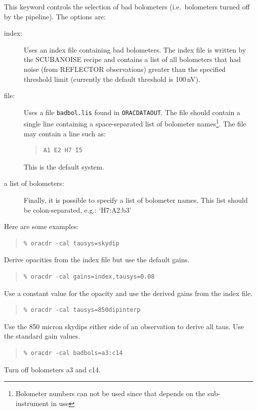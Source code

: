 \documentclass[twoside,11pt]{article}
\renewcommand{\_}{\texttt{\symbol{95}}}
\newcommand{\recipe}[1]{{\small\textsf{#1}}}
\newenvironment{myquote}{\begin{quote}\begin{small}}{\end{small}\end{quote}}
\begin{document}
\begin{itemize}
This keyword controls the selection of bad bolometers (i.e.\ bolometers
turned off by the pipeline). The options are:

\begin{description}
\item[index:] Uses an index file containing bad bolometers. The index
file is written by the \recipe{SCUBA\_NOISE} recipe and contains a list
of all bolometers that had noise (from REFLECTOR observations) greater than
the specified threshold limit (currently the default threshold is 100\,nV).
\item[file:] Uses a file \verb|badbol.lis| found
in \texttt{ORAC\_DATA\_OUT}.
The file should contain a single line containing a space-separated list
of bolometer names\footnote{Bolometer numbers can not be used since that
depends on the sub-instrument in use}. The file may contain a line such as:
\begin{myquote}
\begin{verbatim}
A1 E2 H7 I5
\end{verbatim}
\end{myquote}
This is the default system.
\item[a list of bolometers:] Finally, it is possible to specify a list of
bolometer names. This list should be colon-separated, e.g.: `H7:A2:b3'

\end{description}

\end{itemize}

Here are some examples:

\begin{myquote}
\begin{verbatim}
% oracdr -cal tausys=skydip
\end{verbatim}
\end{myquote}
Derive opacities from the index file but use the default gains.
\begin{myquote}
\begin{verbatim}
% oracdr -cal gains=index,tausys=0.08
\end{verbatim}
\end{myquote}
Use a constant value for the opacity and use the derived gains
from the index file.
\begin{myquote}
\begin{verbatim}
% oracdr -cal tausys=850dipinterp
\end{verbatim}
\end{myquote}
Use the 850 micron skydips either side of an observation
to derive all taus. Use the standard gain values.
\begin{myquote}
\begin{verbatim}
% oracdr -cal badbols=a3:c14
\end{verbatim}
\end{myquote}
Turn off bolometers a3 and c14.
\end{document}
